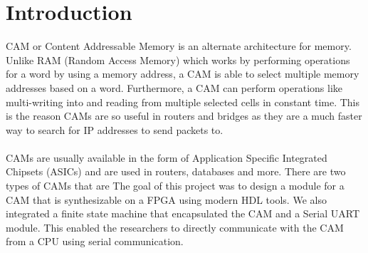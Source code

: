\section{Introduction}
CAM or Content Addressable Memory is an alternate architecture for memory. Unlike RAM (Random Access Memory) which works by 
performing operations for a word by using a memory address, a CAM is able to select multiple memory addresses based on a word. 
Furthermore, a CAM can perform operations like multi-writing into and reading from multiple selected cells in constant time.
This is the reason CAMs are so useful in routers and bridges as they are a much faster way to search for IP addresses to send packets to.
\\\\  
CAMs are usually available in the form of Application Specific Integrated Chipsets (ASICs) and are used in routers, databases and more.
There are two types of CAMs that are
The goal of this project was to design a module for a CAM that is synthesizable on a FPGA using modern HDL tools. 
We also integrated a finite state machine that encapsulated the CAM and a Serial UART module. 
This enabled the researchers to directly communicate with the CAM from a CPU using serial communication. 
